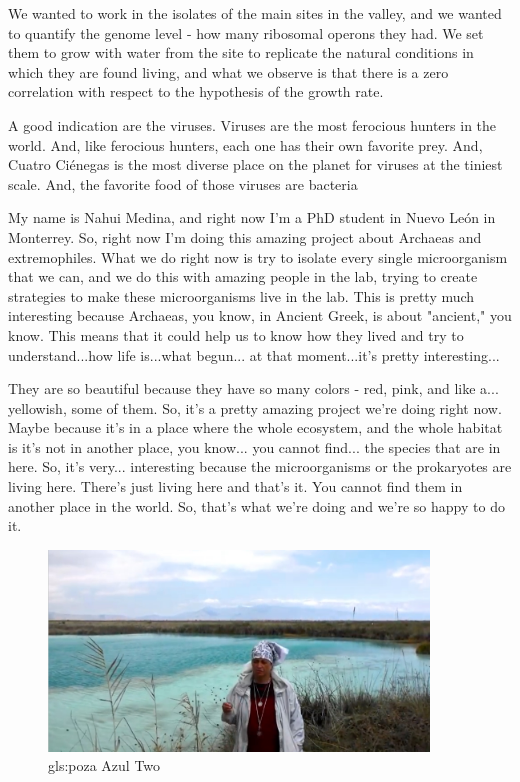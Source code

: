 \documentclass[]{article}
\begin{document}
We wanted to work in the isolates of the main sites in the valley, and we wanted to quantify the genome level - how many ribosomal operons they had. We set them to grow
with water from the site to replicate the natural conditions in which they are found living, and what we observe is that there is a zero correlation with respect to the hypothesis of the growth rate.

A good indication are the viruses. Viruses are the most ferocious hunters in the world. And, like ferocious hunters, each one has their own favorite prey. And, Cuatro  Ci\'enegas is the most diverse place on the planet for viruses at the tiniest scale. And, the favorite food of those viruses are bacteria

My name is Nahui Medina, and right now I'm a PhD student in Nuevo Le\'on in Monterrey. So, right now I'm doing this amazing project about Archaeas and extremophiles. What we do right now is try to isolate every single microorganism that we can, and we do this with amazing people in the lab, trying to create strategies to make these microorganisms live in the lab. This is pretty much interesting because Archaeas, you know, in Ancient Greek, is about "ancient," you know. This means that it could help us to know how they lived and try to understand...how life is...what begun... at that moment...it's pretty interesting...

They are so beautiful because they have so many colors - red, pink, and like a... yellowish, some of them. So, it's a pretty amazing project we're doing right now. 
Maybe because it's in a place where the whole ecosystem, and the whole habitat is 
it's not in another place, you know... you cannot find... the species that are in here. So, it's very... interesting because the microorganisms or the prokaryotes are living here. There's just living here and that's it. You cannot find them in another place in the world. So, that's what we're doing and we're so happy to do it.

\begin{figure}[h!]
	\caption{\Gls{gls:poza} Azul Two} 
	\includegraphics[width=0.9\textwidth]{CuatroCienegas9}
\end{figure}
\end{document}
